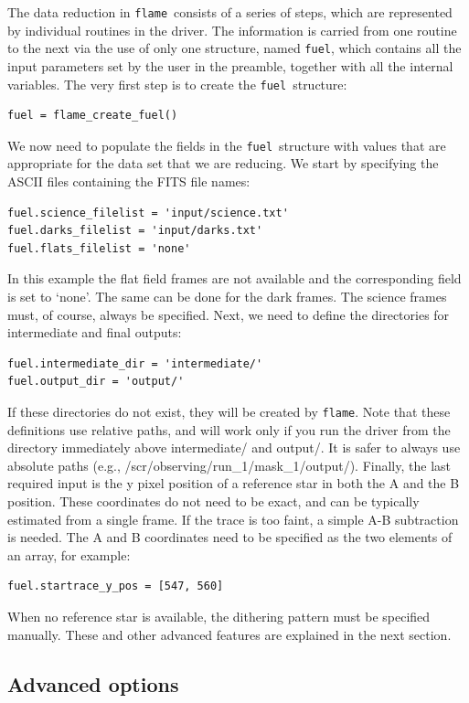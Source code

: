 \documentclass[a4paper, notitlepage]{article}
\newcommand{\flame}{\texttt{flame}}
\newcommand{\fuel}{\texttt{fuel}}
\begin{document}
The data reduction in \flame\ consists of a series of steps, which are represented by individual routines in the driver. The information is carried from one routine to the next via the use of only one structure, named \fuel, which contains all the input parameters set by the user in the preamble, together with all the internal variables. The very first step is to create the \fuel\ structure:
\begin{lstlisting}
fuel = flame_create_fuel()
\end{lstlisting}
We now need to populate the fields in the \fuel\ structure with values that are appropriate for the data set that we are reducing.
We start by specifying the ASCII files containing the FITS file names:
\begin{lstlisting}
fuel.science_filelist = 'input/science.txt'
fuel.darks_filelist = 'input/darks.txt'
fuel.flats_filelist = 'none'
\end{lstlisting}
In this example the flat field frames are not available and the corresponding field is set to \textquoteleft none\textquoteright. The same can be done for the dark frames. The science frames must, of course, always be specified.
Next, we need to define the directories for intermediate and final outputs:
\begin{lstlisting}
fuel.intermediate_dir = 'intermediate/'
fuel.output_dir = 'output/'
\end{lstlisting}
If these directories do not exist, they will be created by \flame. Note that these definitions use relative paths, and will work only if you run the driver from the directory immediately above intermediate/ and output/. It is safer to always use absolute paths (e.g., /scr/observing/run\_1/mask\_1/output/).
Finally, the last required input is the y pixel position of a reference star in both the A and the B position. These coordinates do not need to be exact, and can be typically estimated from a single frame. If the trace is too faint, a simple A-B subtraction is needed. The A and B coordinates need to be specified as the two elements of an array, for example:
\begin{lstlisting}
fuel.startrace_y_pos = [547, 560]
\end{lstlisting}
When no reference star is available, the dithering pattern must be specified manually. These and other advanced features are explained in the next section.



\subsection{Advanced options}
\end{document}
